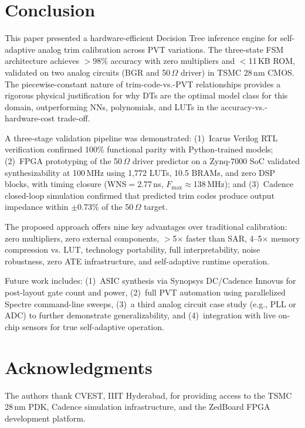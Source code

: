 \documentclass[lettersize,journal]{IEEEtran}
\begin{document}
\section{Conclusion}
This paper presented a hardware-efficient Decision Tree inference engine for self-adaptive analog trim calibration across PVT variations. The three-state FSM architecture achieves $>$98\% accuracy with zero multipliers and $<$11\,KB ROM, validated on two analog circuits (BGR and 50\,$\Omega$ driver) in TSMC 28\,nm CMOS. The piecewise-constant nature of trim-code-vs.-PVT relationships provides a rigorous physical justification for why DTs are the optimal model class for this domain, outperforming NNs, polynomials, and LUTs in the accuracy-vs.-hardware-cost trade-off.

A three-stage validation pipeline was demonstrated: (1)~Icarus Verilog RTL verification confirmed 100\% functional parity with Python-trained models; (2)~FPGA prototyping of the 50\,$\Omega$ driver predictor on a Zynq-7000 SoC validated synthesizability at 100\,MHz using 1,772 LUTs, 10.5 BRAMs, and zero DSP blocks, with timing closure (WNS$=$2.77\,ns, $F_{\max}\approx$138\,MHz); and (3)~Cadence closed-loop simulation confirmed that predicted trim codes produce output impedance within $\pm$0.73\% of the 50\,$\Omega$ target.

The proposed approach offers nine key advantages over traditional calibration: zero multipliers, zero external components, $>$5$\times$ faster than SAR, 4--5$\times$ memory compression vs. LUT, technology portability, full interpretability, noise robustness, zero ATE infrastructure, and self-adaptive runtime operation.

Future work includes: (1)~ASIC synthesis via Synopsys DC/Cadence Innovus for post-layout gate count and power, (2)~full PVT automation using parallelized Spectre command-line sweeps, (3)~a third analog circuit case study (e.g., PLL or ADC) to further demonstrate generalizability, and (4)~integration with live on-chip sensors for true self-adaptive operation.


\section*{Acknowledgments}
The authors thank CVEST, IIIT Hyderabad, for providing access to the TSMC 28\,nm PDK, Cadence simulation infrastructure, and the ZedBoard FPGA development platform.
\end{document}
